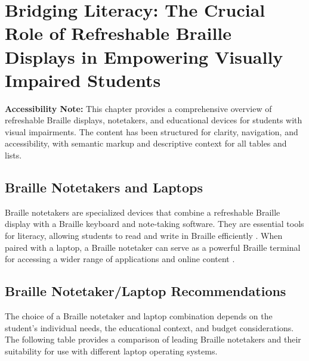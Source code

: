 \chapter{Bridging Literacy: The Crucial Role of Refreshable Braille Displays in Empowering Visually Impaired Students}\label{ch3:braille}
\raggedright

\begin{raggedright}
	\textbf{Accessibility Note:} This chapter provides a comprehensive overview of refreshable Braille displays, notetakers, and educational devices for students with visual impairments. The content has been structured for clarity, navigation, and accessibility, with semantic markup and descriptive context for all tables and lists.
\end{raggedright}

\section{Braille Notetakers and Laptops}\label{ch3:sec:notetakers-laptops}
Braille notetakers are specialized devices that combine a refreshable Braille display with a Braille keyboard and note-taking software. They are essential tools for literacy, allowing students to read and write in Braille efficiently \supercite{Holbrook2006, Presley2012}. When paired with a laptop, a Braille notetaker can serve as a powerful Braille terminal for accessing a wider range of applications and online content \supercite{Kelly2011}.

\section{Braille Notetaker/Laptop Recommendations}\label{ch3:sec:notetaker-laptop-recs}
The choice of a Braille notetaker and laptop combination depends on the student's individual needs, the educational context, and budget considerations. The following table provides a comparison of leading Braille notetakers and their suitability for use with different laptop operating systems.

